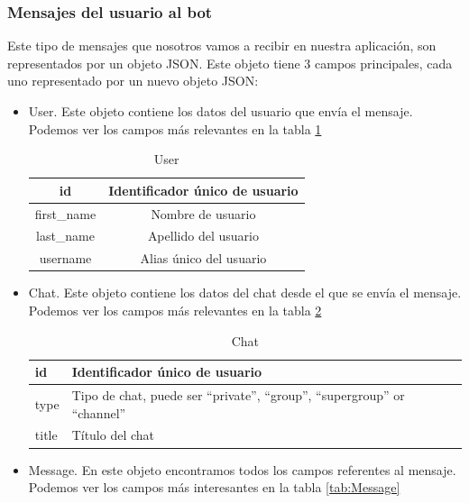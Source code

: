 \documentclass[10pt,journal,compsoc]{IEEEtran}
\begin{document}
\subsubsection{Mensajes del usuario al bot}
Este tipo de mensajes que nosotros vamos a recibir en nuestra aplicación, son 
representados por un objeto JSON. Este objeto tiene 3 campos principales, cada uno representado por
un nuevo objeto JSON:
\begin{itemize}
  \item User. Este objeto contiene los datos del usuario que envía el mensaje.
 Podemos ver los campos más relevantes en la tabla \ref{tab:User}
  
  \begin{table}[h]
  \centering
  \begin{tabular}{cc}
  id  & Identificador único de usuario \\ \hline
  first\_name & Nombre de usuario \\ \hline
  last\_name & Apellido del usuario \\ \hline
  username & Alias único del usuario \\ \hline
  \end{tabular} 
  \caption{User}
  \label{tab:User}
  \end{table}

  \item Chat. Este objeto contiene los datos del chat desde el que se envía el 
  mensaje. Podemos ver los campos más relevantes en la tabla \ref{tab:Chat}
  
   \begin{table}[h]
  \centering
  \begin{tabular}{>{\centering\arraybackslash}m{1cm} >{\centering\arraybackslash}m{4cm}}
  id  & Identificador único de usuario \\ \hline
  type & Tipo de chat, puede ser “private”, “group”, “supergroup” or “channel” 
  \\ \hline
  title & Título del chat \\ \hline
  \end{tabular} 
  \caption{Chat}
  \label{tab:Chat}
  \end{table}
  
  \item Message. En este objeto encontramos todos los campos referentes al 
  mensaje. Podemos ver los campos más interesantes en la tabla \ref{tab:Message}
  

\end{itemize}
\end{document}
